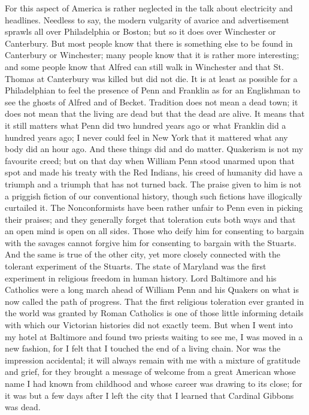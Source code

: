 \documentclass{book}
\begin{document}
For this aspect of America is rather neglected in the talk about electricity and headlines. Needless to say, the modern vulgarity of avarice and advertisement sprawls all over Philadelphia or Boston; but so it does over Winchester or Canterbury. But most people know that there is something else to be found in Canterbury or Winchester; many people know that it is rather more interesting; and some people know that Alfred can still walk in Winchester and that St. Thomas at Canterbury was killed but did not die. It is at least as possible for a Philadelphian to feel the presence of Penn and Franklin as for an Englishman to see the ghosts of Alfred and of Becket. Tradition does not mean a dead town; it does not mean that the living are dead but that the dead are alive. It means that it still matters what Penn did two hundred years ago or what Franklin did a hundred years ago; I never could feel in New York that it mattered what any body did an hour ago. And these things did and do matter. Quakerism is not my favourite creed; but on that day when William Penn stood unarmed upon that spot and made his treaty with the Red Indians, his creed of humanity did have a triumph and a triumph that has not turned back. The praise given to him is not a priggish fiction of our conventional history, though such fictions have illogically curtailed it. The Nonconformists have been rather unfair to Penn even in picking their praises; and they generally forget that toleration cuts both ways and that an open mind is open on all sides. Those who deify him for consenting to bargain with the savages cannot forgive him for consenting to bargain with the Stuarts. And the same is true of the other city, yet more closely connected with the tolerant experiment of the Stuarts. The state of Maryland was the first experiment in religious freedom in human history. Lord Baltimore and his Catholics were a long march ahead of William Penn and his Quakers on what is now called the path of progress. That the first religious toleration ever granted in the world was granted by Roman Catholics is one of those little informing details with which our Victorian histories did not exactly teem. But when I went into my hotel at Baltimore and found two priests waiting to see me, I was moved in a new fashion, for I felt that I touched the end of a living chain. Nor was the impression accidental; it will always remain with me with a mixture of gratitude and grief, for they brought a message of welcome from a great American whose name I had known from childhood and whose career was drawing to its close; for it was but a few days after I left the city that I learned that Cardinal Gibbons was dead.
\end{document}
